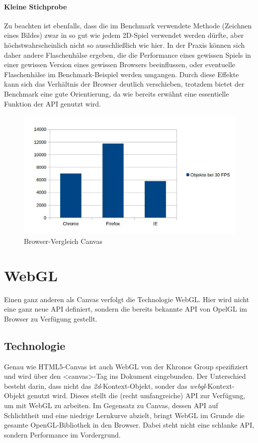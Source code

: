 \documentclass[a4paper, 12pt]{article}
\begin{document}
\paragraph{Kleine Stichprobe} Zu beachten ist ebenfalls, dass die im Benchmark verwendete Methode (Zeichnen eines Bildes) zwar in so gut wie jedem 2D-Spiel verwendet werden dürfte, aber höchstwahrscheinlich nicht so ausschließlich wie hier. In der Praxis können sich daher andere Flaschenhälse ergeben, die die Performance eines gewissen Spiels in einer gewissen Version eines gewissen Browsers beeinflussen, oder eventuelle Flaschenhälse im Benchmark-Beispiel werden umgangen. Durch diese Effekte kann sich das Verhältnis der Browser deutlich verschieben, trotzdem bietet der Benchmark eine gute Orientierung, da wie bereits erwähnt eine essentielle Funktion der API genutzt wird.
\begin{figure}[H]
	\includegraphics[width=\textwidth]{assets/browser_comp_canvas} 
	\caption{Browser-Vergleich Canvas}
	\label{browser_comp_canvas}
\end{figure}
\newpage
\section{WebGL}
Einen ganz anderen als Canvas verfolgt die Technologie WebGL. Hier wird nicht eine ganz neue API definiert, sondern die bereits bekannte API von OpelGL im Browser zu Verfügung gestellt.
\subsection{Technologie}
Genau wie HTML5-Canvas ist auch WebGL von der Khronos Group spezifiziert und wird über den <canvas>-Tag ins Dokument eingebunden. Der Unterschied besteht darin, dass nicht das \emph{2d}-Kontext-Objekt, sonder das \emph{webgl}-Kontext-Objekt genutzt wird. Dieses stellt die (recht umfangreiche) API zur Verfügung, um mit WebGL zu arbeiten. Im Gegensatz zu Canvas, dessen API auf Schlichtheit und eine niedrige Lernkurve abzielt, bringt WebGL im Grunde die gesamte OpenGL-Bibliothek in den Browser. Dabei steht nicht eine schlanke API, sondern Performance im Vordergrund.\cite{WebGLSpec}
\end{document}

